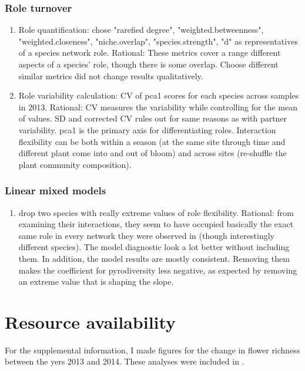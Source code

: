\documentclass{article}\usepackage[]{graphicx}\usepackage[]{color}
\begin{document}
\subsubsection{Role turnover}
  \label{sec:pop_resist_dp2}
\begin{enumerate}
\item Role quantification: chose "rarefied degree",
  "weighted.betweenness", "weighted.closeness", "niche.overlap",
  "species.strength", "d" as representatives of a species network
  role. Rational: These metrics cover a range different aspects of a
  species' role, though there is some overlap. Choose different
  similar metrics did not change results qualitatively.
\item Role variability calculation: CV of pca1 scores for each species
  across samples in 2013. Rational: CV measures the variability while
  controlling for the mean of values. SD and corrected CV rules out
  for same reasons as with partner variability. pca1 is the primary
  axis for differentiating roles. Interaction flexibility can be both
  within a season (at the same site through time and different plant
  come into and out of bloom) and across sites (re-shuffle the plant
  community composition).
\end{enumerate}
  
\subsubsection{Linear mixed models}
  \label{sec:pop_resist_dp3}
\begin{enumerate}
  \item drop two species with really extreme values of role
    flexibility. Rational: from examining their interactions, they
    seem to have occupied basically the exact same role in every
    network they were observed in (though interestingly different
    species). The model diagnostic look a lot better without including
    them. In addition, the model results are mostly
    consistent. Removing them makes the coefficient for pyrodiversity
    less negative, as expected by removing an extreme value that is
    shaping the slope. 
  \end{enumerate}


\section{Resource availability}
  \label{sec:resource}
For the supplemental information, I made figures for the change in
  flower richness between the yers 2013 and 2014. These analyses were
  included in \cite{ponisio2016pyrodiversity}.


\clearpage

\clearpage
\end{document}
